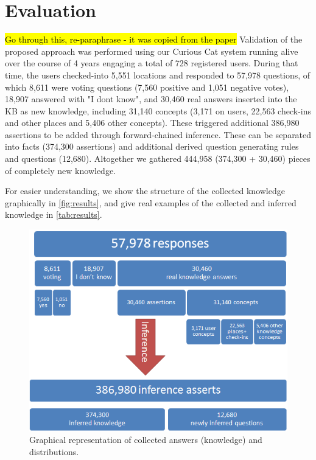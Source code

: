 % 
\chapter{Evaluation}
\hl{Go through this, re-paraphrase - it was copied from the paper}
Validation of the proposed approach was performed using our Curious Cat system 
running alive over the course of 4 years engaging a total of 728 registered 
users. During that time, the users checked-into 5,551 locations and responded 
to 57,978 questions, of which 8,611 were voting questions (7,560 positive and 
1,051 negative votes), 18,907 answered with "I dont know", and 30,460 real 
answers inserted into the KB as new knowledge, including 31,140 concepts 
(3,171 on users, 22,563 check-ins and other places and 5,406 other concepts). 
These triggered additional 386,980 assertions to be added through 
forward-chained inference. These can be separated into facts (374,300 
assertions) and additional derived question generating rules and questions 
(12,680). Altogether we gathered 444,958 (374,300 + 30,460) pieces of 
completely new knowledge. 

For easier understanding, we show the structure of the collected knowledge 
graphically in \autoref{fig:results}, and give real examples of the collected 
and inferred knowledge in \autoref{tab:results}.

\begin{figure}[h]
	\centering
		\includegraphics[width=1\textwidth]{figures/results.png}
	\caption{Graphical representation of collected answers (knowledge) and 
    distributions.}
	\label{fig:results}
\end{figure}

